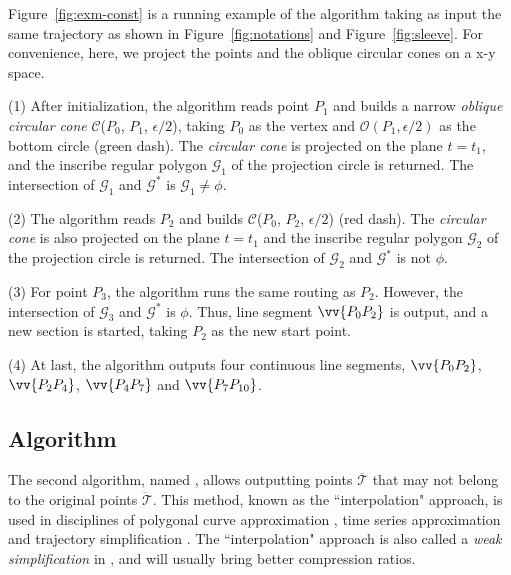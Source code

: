 \begin{example}
\label{exm-alg-conest}
Figure~\ref{fig:exm-const} is a running example of the \cist algorithm taking as input the same trajectory as shown in Figure~\ref{fig:notations} and Figure~\ref{fig:sleeve}.
For convenience, here, we project the points and the oblique circular cones on a x-y space.

\ni (1) After initialization, the \cist algorithm reads point $P_1$ and builds a narrow \emph{oblique circular cone} $\mathcal{C}$($P_0$, $P_{1}$, $\epsilon/2$), taking $P_0$ as the vertex and $\mathcal{O}(P_1, \epsilon/2)$ as the bottom circle (green dash). The \emph{circular cone} is projected on the plane $t=t_1$, and the inscribe regular polygon $\mathcal{G}_1$ of the projection circle is returned. The intersection of $\mathcal{G}_1$ and $\mathcal{G}^*$ is $\mathcal{G}_1 \ne \phi$.

\ni (2) The algorithm reads $P_2$ and builds $\mathcal{C}$($P_0$, $P_{2}$, $\epsilon/2$) (red dash). The \emph{circular cone} is also projected on the plane $t=t_1$ and the inscribe regular polygon $\mathcal{G}_2$ of the projection circle is returned. The intersection of $\mathcal{G}_2$ and $\mathcal{G}^*$ is not $\phi$.

\ni (3) For point $P_3$, the algorithm runs the same routing as $P_2$. However, the intersection of $\mathcal{G}_3$ and $\mathcal{G}^*$ is $\phi$. Thus, line segment $\vv{P_0P_2}$ is output, and a new section is started, taking $P_2$ as the new start point.

\ni (4) At last, the algorithm outputs four continuous line segments, \ie $\vv{P_0P_2}$, $\vv{P_2P_4}$, $\vv{P_4P_{7}}$ and $\vv{P_7P_{10}}$.
\end{example}





\subsection{{Algorithm \cista}}


The second algorithm, named \cista, allows outputting points $\overline{\mathcal{T}}$ that may not belong to the original points $\dddot{\mathcal{T}}$.
This method, known as the ``interpolation" approach, is used in disciplines of polygonal curve approximation \cite{Williams:Bounded, Heckbert:Survey, Zhao:Sleeve}, time series approximation \cite{ORourke:Fitting, Elmeleegy:Stream, Xie:Stream, Luo:Streaming} and trajectory simplification \cite{Lin:Operb}.
The ``interpolation" approach is also called a \emph{weak simplification} in \cite{Trajcevski:DDR}, and will usually bring better compression ratios.

